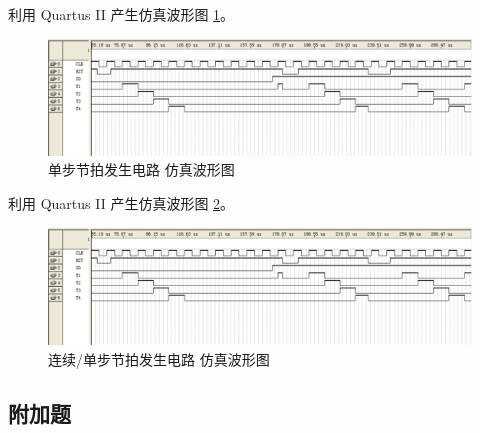 利用 Quartus II 产生仿真波形图 \ref{fig:wave1_2}。

\begin{figure}[H]
\centering
\includegraphics[width=\textwidth]{images/wave1_2.png}
\caption{单步节拍发生电路 仿真波形图}
\label{fig:wave1_2}
\end{figure}

利用 Quartus II 产生仿真波形图 \ref{fig:wave1_3}。

\begin{figure}[H]
\centering
\includegraphics[width=\textwidth]{images/wave1_3.png}
\caption{连续/单步节拍发生电路 仿真波形图}
\label{fig:wave1_3}
\end{figure}

\subsection{附加题}

